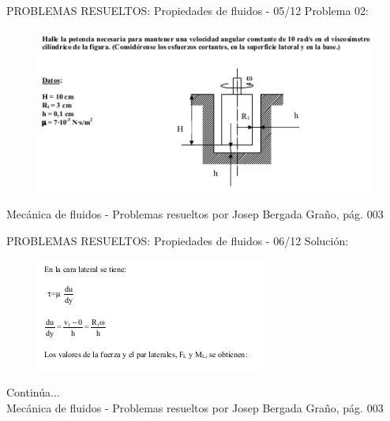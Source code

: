 \begin{frame}{PROBLEMAS RESUELTOS: Propiedades de fluidos - 05/12}
\justifying
Problema 02:
\begin{figure}[H]
\centering
\includegraphics[scale=0.4]{Section_Files/S2-imagenes-Jhon/Book-ProbResuelts/P02-E01.png}
\end{figure}
{\tiny Mecánica de fluidos - Problemas resueltos por Josep Bergada Graño, pág. 003}
\end{frame}

\begin{frame}{PROBLEMAS RESUELTOS: Propiedades de fluidos - 06/12}
\justifying
Solución:
\begin{figure}[H]
\centering
\includegraphics[scale=0.4]{Section_Files/S2-imagenes-Jhon/Book-ProbResuelts/P02-E02.png}
\end{figure}
Continúa...\\
{\tiny Mecánica de fluidos - Problemas resueltos por Josep Bergada Graño, pág. 003}
\end{frame}

